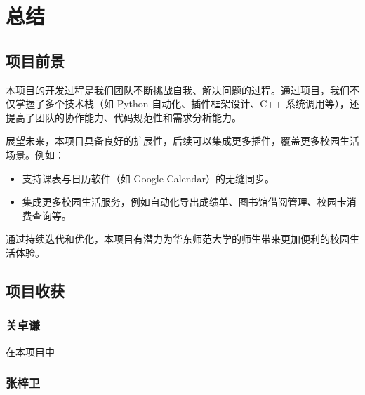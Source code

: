 \documentclass[14pt,a4paper,UTF8,twoside]{article}
\begin{document}
\section{总结}

\subsection{项目前景}

本项目的开发过程是我们团队不断挑战自我、解决问题的过程。通过项目，我们不仅掌握了多个技术栈（如 Python 自动化、插件框架设计、C++ 系统调用等），还提高了团队的协作能力、代码规范性和需求分析能力。

展望未来，本项目具备良好的扩展性，后续可以集成更多插件，覆盖更多校园生活场景。例如：
\begin{itemize}
    \item 支持课表与日历软件（如 Google Calendar）的无缝同步。
    \item 集成更多校园生活服务，例如自动化导出成绩单、图书馆借阅管理、校园卡消费查询等。
\end{itemize}

通过持续迭代和优化，本项目有潜力为华东师范大学的师生带来更加便利的校园生活体验。

\subsection{项目收获}

\subsubsection*{关卓谦}

\begin{Thought}
在本项目中
\end{Thought}

\subsubsection*{张梓卫}
\end{document}
